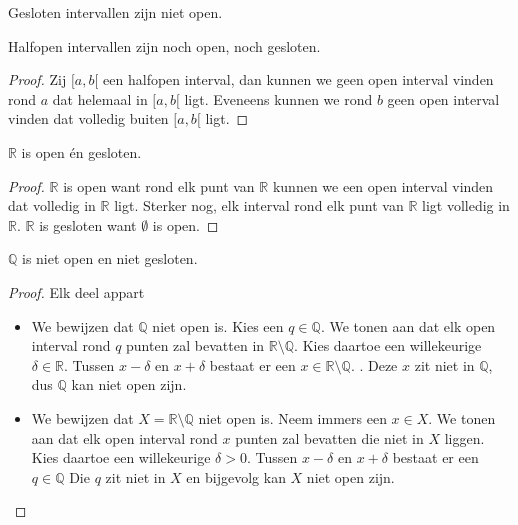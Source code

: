 \documentclass[main.tex]{subfiles}
\begin{document}
\begin{st}
  Gesloten intervallen zijn niet open.
\end{st}

\begin{st}
  Halfopen intervallen zijn noch open, noch gesloten.

  \begin{proof}
    Zij $[a,b[$ een halfopen interval, dan kunnen we geen open interval vinden rond $a$ dat helemaal in $[a,b[$ ligt.
    Eveneens kunnen we rond $b$ geen open interval vinden dat volledig buiten $[a,b[$ ligt.
  \end{proof}
\end{st}

\begin{st}
  \label{st:r-open-en-gesloten}
  $\mathbb{R}$ is open \'en gesloten.

  \begin{proof}
    $\mathbb{R}$ is open want rond elk punt van $\mathbb{R}$ kunnen we een open interval vinden dat volledig in $\mathbb{R}$ ligt.
    Sterker nog, elk interval rond elk punt van $\mathbb{R}$ ligt volledig in $\mathbb{R}$.
    $\mathbb{R}$ is gesloten want $\emptyset$ is open.
  \end{proof}
\end{st}

\begin{st}
  $\mathbb{Q}$ is niet open en niet gesloten.

  \begin{proof}
    Elk deel appart
    \begin{itemize}
    \item We bewijzen dat $\mathbb{Q}$ niet open is.
      Kies een $q \in \mathbb{Q}$.
      We tonen aan dat elk open interval rond $q$ punten zal bevatten in $\mathbb{R}\setminus\mathbb{Q}$.
      Kies daartoe een willekeurige $\delta \in \mathbb{R}$.
      Tussen $x-\delta$ en $x+\delta$ bestaat er een $x\in \mathbb{R}\setminus\mathbb{Q}$.\needed
      .
      Deze $x$ zit niet in $\mathbb{Q}$, dus $\mathbb{Q}$ kan niet open zijn.
    \item We bewijzen dat $X=\mathbb{R}\setminus \mathbb{Q}$ niet open is.
      Neem immers een $x\in X$.
      We tonen aan dat elk open interval rond $x$ punten zal bevatten die niet in $X$ liggen.
      Kies daartoe een willekeurige $\delta > 0$.
      Tussen $x-\delta$ en $x+\delta$ bestaat er een $q\in \mathbb{Q}$
      Die $q$ zit niet in $X$ en bijgevolg kan $X$ niet open zijn.
    \end{itemize}
  \end{proof}
\end{st}
\end{document}
